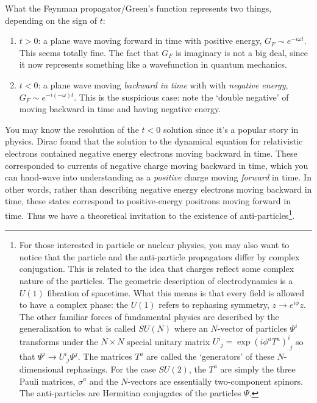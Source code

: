 What the Feynman propagator/Green's function represents two things, depending on the sign of $t$:
\begin{enumerate}
\item $t>0$: a plane wave moving forward in time with positive energy, $G_F \sim e^{-i\omega t}$. This seems totally fine. The fact that $G_F$ is imaginary is not a big deal, since it now represents something like a wavefunction in quantum mechanics. 
\item $t<0$: a plane wave moving \emph{backward in time} with  with \emph{negative energy}, $G_F \sim e^{-i(-\omega) t}$. This is the suspicious case: note the `double negative' of moving backward in time and having negative energy.
\end{enumerate}
You may know the resolution of the $t<0$ solution since it's a popular story in physics. Dirac found that the solution to the dynamical equation for relativistic electrons contained negative energy electrons moving backward in time. These corresponded to currents of negative charge moving backward in time, which you can hand-wave into understanding as a \emph{positive} charge moving \emph{forward} in time. In other words, rather than describing negative energy electrons moving backward in time, these states correspond to positive-energy positrons moving forward in time. Thus we have a theoretical invitation to the existence of anti-particles\footnote{For those interested in particle or nuclear physics, you may also want to notice that the particle and the anti-particle propagators differ by complex conjugation. This is related to the idea that charges reflect some complex nature of the particles. The geometric description of electrodynamics is a $U(1)$ fibration of spacetime. What this means is that every field is allowed to have a complex phase: the $U(1)$ refers to rephasing symmetry, $z\to e^{i\phi} z$. The other familiar forces of fundamental physics are described by the generalization to what is called $SU(N)$ where an $N$-vector of particles $\Psi^i$ transforms under the $N\times N$ special unitary matrix $U^i_{\phantom i j}=\exp(i\phi^a T^a)^i_{\phantom i j}$ so that $\Psi^i \to U^i_{\phantom i j} \Psi^j$. The matrices $T^a$ are called the `generators' of these $N$-dimensional rephasings. For the case $SU(2)$, the $T^a$ are simply the three Pauli matrices, $\sigma^a$ and the $N$-vectors are essentially two-component spinors. The anti-particles are Hermitian conjugates of the particles $\Psi$.\label{footnote:U1:SUN}}. 



